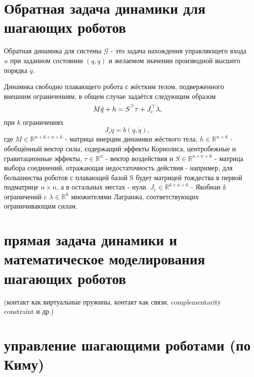 \section{Обратная задача динамики для шагающих роботов}\label{sec:ch2/sect4}
Обратная динамика для системы $\mathcal{G}$ - это задача нахождения управляющего входа ${u}$ при заданном состоянии $({q}, \dot{{q}})$ и желаемом значении производной высшего порядка $\ddot{{q}}$.

Динамика свободно плавающего робота с жёстким телом, подверженного внешним ограничениям, в общем случае задаётся следующим образом
\begin{equation}
	M \ddot{q} +h =S^\top\tau + J_c^\top \lambda,
\end{equation}
при $k$ ограничениях
\begin{equation}
	J_c \ddot{q} = b(q,\dot{q}),
\end{equation}
где $M \in \mathbb{R}^{n+6 \times n+6}$ - матрица инерции динамики жёсткого тела, $h \in \mathbb{R}^{n+6}$ - обобщённый вектор силы, содержащий эффекты Кориолиса, центробежные и гравитационные эффекты, $\tau \in \mathbb{R}^{n}$ - вектор воздействия и $S \in \mathbb{R}^{n \times n+6}$ - матрица выбора соединений, отражающая недостаточность действия - например, для большинства роботов с плавающей базой S будет матрицей тождества в первой подматрице $n \times n$, а в остальных местах - нули. 
$J_c \in \mathbb{R}^{k \times n+6}$ - Якобиан $k$ ограничений c $\lambda \in \mathbb{R}^{k}$ множителями Лагранжа, соответствующих ограничивающим силам.


\section{прямая задача динамики и математическое моделирования шагающих роботов}\label{sec:ch2/sect5}
(контакт как виртуальные пружины, контакт как связи, complementarity constraint и др.)
\section{управление шагающими роботами (по Киму)}\label{sec:ch2/sect6}
\FloatBarrier
